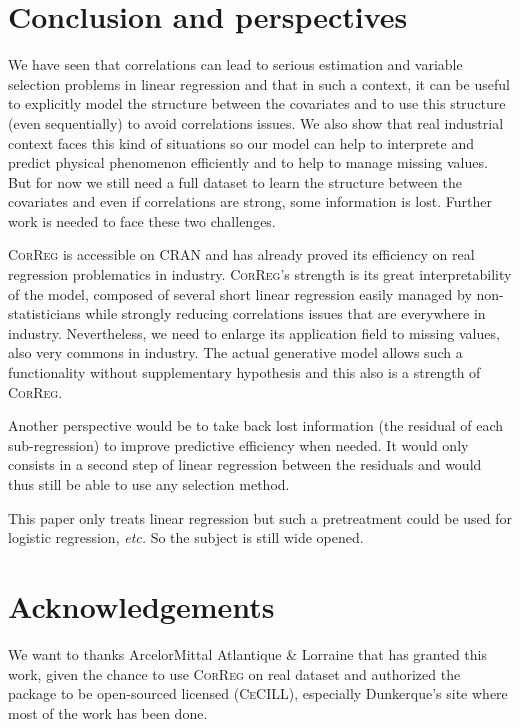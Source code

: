 \documentclass[11pt,a4paper]{article}
\begin{document}
\section{Conclusion and perspectives} \label{conclusion}
	We have seen that correlations can lead to serious estimation and variable selection problems in linear regression and that in such a context, it can be useful to explicitly model the structure between the covariates and to use this structure (even sequentially) to avoid correlations issues. We also show that real industrial context faces this kind of situations so our model can help to interprete and predict physical phenomenon efficiently and to help to manage missing values. But for now we still need a full dataset to learn the structure between the covariates and even if correlations are strong, some information is lost. Further work is needed to face these two challenges.
	
	\textsc{CorReg} is accessible on CRAN and has already proved its efficiency on real regression problematics in industry. \textsc{CorReg}'s strength is its great interpretability of the model, composed of several short linear regression easily managed by non-statisticians while strongly reducing correlations issues that are everywhere in industry.
	Nevertheless, we need to enlarge its application field to missing values, also very commons in industry. The actual generative model allows such a functionality without supplementary hypothesis and this also is a strength of \textsc{CorReg}. 
	
	Another perspective would be to take back lost information (the residual of each sub-regression) to improve predictive efficiency when needed. It would only consists in a second step of linear regression between the residuals and would thus still be able to use any selection method.
	
	This paper only treats linear regression but such a pretreatment could be used for logistic regression, {\it etc.}
	So the subject is still wide opened.	

\section{Acknowledgements}
	We want to thanks ArcelorMittal Atlantique \& Lorraine that has granted this work, given the chance to use \textsc{CorReg} on real dataset and authorized the package to be open-sourced licensed (\textsc{CeCILL}), especially Dunkerque's site where most of the work has been done.
{}

\end{document}
